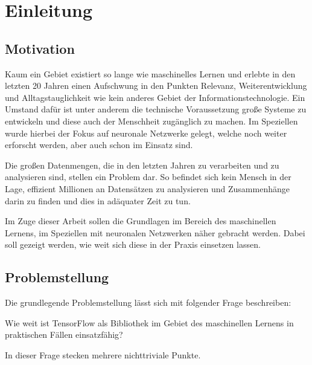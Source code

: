 \chapter{Einleitung}
\label{cha:Einleitung}

\section{Motivation}

Kaum ein Gebiet existiert so lange wie maschinelles Lernen und erlebte in den letzten 20 Jahren einen Aufschwung in den Punkten Relevanz, Weiterentwicklung und Alltagstauglichkeit wie kein anderes Gebiet der Informationstechnologie. 
Ein Umstand dafür ist unter anderem die technische Voraussetzung große Systeme zu entwickeln und diese auch der Menschheit zugänglich zu machen. 
Im Speziellen wurde hierbei der Fokus auf neuronale Netzwerke gelegt, welche noch weiter erforscht werden, aber auch schon im Einsatz sind. \newline

\noindent
Die großen Datenmengen, die in den letzten Jahren zu verarbeiten und zu analysieren sind, stellen ein Problem dar. 
So befindet sich kein Mensch in der Lage, effizient Millionen an Datensätzen zu analysieren und Zusammenhänge darin zu finden und dies in adäquater Zeit zu tun. \newline

\noindent
Im Zuge dieser Arbeit sollen die Grundlagen im Bereich des maschinellen Lernens, im Speziellen mit neuronalen Netzwerken näher gebracht werden. 
Dabei soll gezeigt werden, wie weit sich diese in der Praxis einsetzen lassen. 

\section{Problemstellung}

Die grundlegende Problemstellung lässt sich mit folgender Frage beschreiben: \newline

Wie weit ist TensorFlow als Bibliothek im Gebiet des maschinellen Lernens in praktischen Fällen einsatzfähig? \newline

\noindent
In dieser Frage stecken mehrere nichttriviale Punkte. 

